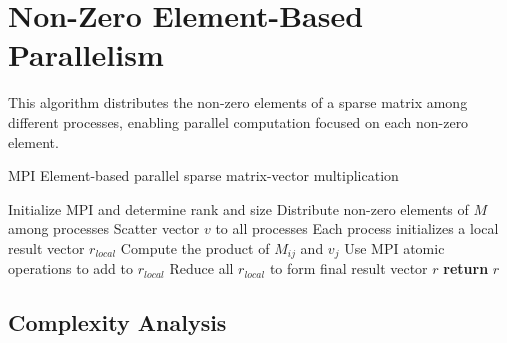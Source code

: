 \documentclass[12pt,oneside]{book} %
\begin{document}
\newpage
\section{Non-Zero Element-Based Parallelism}
This algorithm distributes the non-zero elements of a sparse matrix among
different processes, enabling parallel computation focused on each non-zero
element.

\begin{algorithm}[H]
    \caption{MPI Element-based parallel sparse matrix-vector multiplication}
    \begin{algorithmic}[1]
        \State Initialize MPI and determine rank and size
        \State Distribute non-zero elements of $M$ among processes
        \State Scatter vector $v$ to all processes
        \State Each process initializes a local result vector $r_{local}$
        \State Compute the product of $M_{ij}$ and $v_j$
        \State Use MPI atomic operations to add to $r_{local}$
        \EndFor
        \State Reduce all $r_{local}$ to form final result vector $r$
        \State \textbf{return} $r$
        \EndProcedure
    \end{algorithmic}
\end{algorithm}

\subsection{Complexity Analysis}
\end{document}
